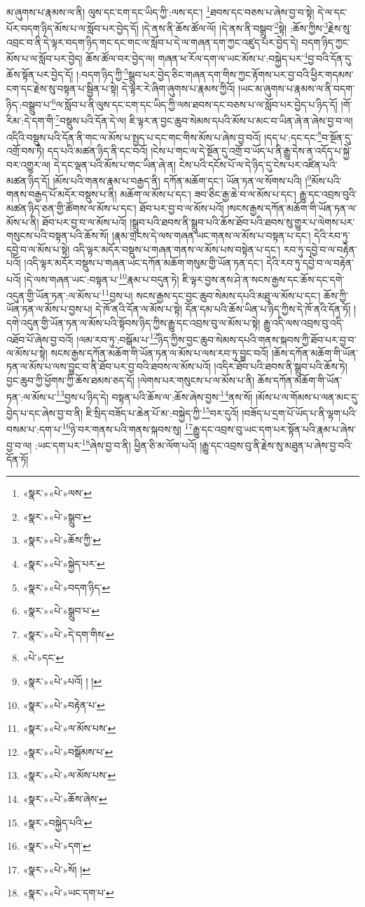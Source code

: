 མ་ཞུགས་པ་རྣམས་ལ་ནི། ལུས་དང་ངག་དང་ཡིད་ཀྱི་:ལས་དང་། \footnote{«སྣར་»«པེ་»ལས་}ཐབས་དང་བཅས་པ་ཞེས་བྱ་བ་སྟེ། དེ་ལ་དང་པོར་བདག་ཉིད་མོས་པ་ལ་སློབ་པར་བྱེད་དོ། །དེ་ནས་ནི་ཆོས་ཚོལ་ལོ། །དེ་ནས་ནི་བསྒྲུབ་\footnote{«སྣར་»«པེ་»སྒྲུབ་}སྟེ། :ཆོས་ཀྱིས་\footnote{«སྣར་»«པེ་»ཆོས་ཀྱི་}རྗེས་སུ་འབྲང་བ་ནི་དེ་ལྟར་བདག་ཉིད་གང་དང་གང་ལ་སློབ་པ་དེ་ལ་གཞན་དག་ཀྱང་འཛུད་པར་བྱེད་དེ། བདག་ཉིད་ཀྱང་མོས་པ་ལ་སློབ་པར་བྱེད། ཆོས་ཚོལ་བར་བྱེད་ལ། གཞན་ཕ་རོལ་དག་ལ་ཡང་མོས་པ་:བསྐྱེད་པར་\footnote{«སྣར་»«པེ་»སྐྱེད་པར་}བྱ་བའི་དོན་དུ་ཆོས་སྟོན་པར་བྱེད་དོ། །:བདག་ཉིད་ཀྱི་\footnote{«སྣར་»«པེ་»བདག་ཉིད་}སྒྲུབ་པར་བྱེད་ཅིང་གཞན་དག་གིས་ཀྱང་རྟོགས་པར་བྱ་བའི་ཕྱིར་གདམས་ངག་དང་རྗེས་སུ་བསྟན་པ་སྦྱིན་པ་སྟེ། དེ་ལྟར་རེ་ཞིག་ཞུགས་པ་རྣམས་ཀྱིའོ། །ཡང་མ་ཞུགས་པ་རྣམས་ལ་ནི་བདག་ཉིད་:བསྒྲུབ་པ་\footnote{«སྣར་»«པེ་»སྒྲུབ་པ་}ལ་སློབ་པ་ནི་ལུས་དང་ངག་དང་ཡིད་ཀྱི་ལས་ཐབས་དང་བཅས་པ་ལ་སློབ་པར་བྱེད་པ་ཉིད་དོ། །གོ་རིམ་:དེ་དག་གི་\footnote{«སྣར་»«པེ་»དེ་དག་གིས་}བསྡུས་པའི་དོན་དེ་ལ། ཇི་ལྟར་ན་བྱང་ཆུབ་སེམས་དཔའི་མོས་པ་མང་བ་ཡིན་ཞེ་ན་ཞེས་བྱ་བ་ལ། འདིའི་བསྡུས་པའི་དོན་ནི་གང་ལ་མོས་པ་སྤྱད་པ་དང་གང་གིས་མོས་པ་ཞེས་བྱ་བའོ། །དད་པ་:དང་དང་\footnote{«པེ་»དང་}བ་སྔོན་དུ་འགྲོ་བས་ཏེ། དད་པའི་མཚན་ཉིད་ནི་དང་བའོ། །ངེས་པ་གང་ལ་དེ་སྔོན་དུ་འགྲོ་བ་ཡོད་པ་ནི་རྒྱུ་དེས་ན་འདོད་པ་སྐྱེ་བར་འགྱུར་ལ། དེ་དང་ལྡན་པའི་མོས་པ་གང་ཡིན་ཞེ་ན། ངེས་པའི་དངོས་པོ་ལ་དེ་ཉིད་དུ་ངེས་པར་འཛིན་པའི་མཚན་ཉིད་དོ། །མོས་པའི་གནས་རྣམ་པ་བརྒྱད་ནི། དཀོན་མཆོག་དང་། ཡོན་ཏན་ལ་སོགས་པའི། །\footnote{«སྣར་»«པེ་»པའོ། ། །}མོས་པའི་གནས་བརྒྱད་པོ་མདོར་བསྡུས་པ་ནི། མཆོག་ལ་མོས་པ་དང་། ཟབ་ཅིང་རྒྱ་ཆེ་བ་ལ་མོས་པ་དང་། རྒྱུ་དང་འབྲས་བུའི་མཚན་ཉིད་ཅན་གྱི་ཚོགས་ལ་མོས་པ་དང་། ཐོབ་པར་བྱ་བ་ལ་མོས་པའོ། །སངས་རྒྱས་དཀོན་མཆོག་གི་ཡོན་ཏན་ལ་མོས་པ་ནི། ཐོབ་པར་བྱ་བ་ལ་མོས་པའོ། །སྒྲུབ་པའི་ཐབས་ནི་སྒྲུབ་པའི་ཆོས་ཐོབ་པའི་ཐབས་སུ་གྱུར་པ་ལེགས་པར་གསུངས་པའི་བསྟན་པའི་ཆོས་སོ། །རྣམ་གྲངས་དེ་ལས་གཞན་ཡང་གནས་ལ་མོས་པ་བསྟན་པ་དང་། དེའི་རབ་ཏུ་དབྱེ་བ་ལ་མོས་པ་སྟེ། འདི་ལྟར་མདོར་བསྡུས་པ་གཞན་གནས་ལ་མོས་པས་བསྟེན་པ་དང་། རབ་ཏུ་དབྱེ་བ་ལ་བརྟེན་པའོ། །འདི་ལྟར་མདོར་བསྡུས་པ་གཞན་ཡང་དཀོན་མཆོག་གསུམ་གྱི་ཡོན་ཏན་དང་། དེའི་རབ་ཏུ་དབྱེ་བ་ལ་བརྟེན་པའོ། །དེ་ལས་གཞན་ཡང་:བསྟན་པ་\footnote{«སྣར་»«པེ་»བརྟེན་པ་}རྣམ་པ་བདུན་ཏེ། ཇི་ལྟར་བྱས་ནས་ཤེ་ན་སངས་རྒྱས་དང་ཆོས་དང་དགེ་འདུན་གྱི་ཡོན་ཏན་:ལ་མོས་པ་\footnote{«སྣར་»«པེ་»ལ་མོས་པས་}བྱས་པ། སངས་རྒྱས་དང་བྱང་ཆུབ་སེམས་དཔའི་མཐུ་ལ་མོས་པ་དང་། ཆོས་ཀྱི་ཡོན་ཏན་ལ་མོས་པ་བྱས་པ། དེ་ཁོ་ནའི་དོན་ལ་མོས་པ་སྟེ། དོན་དམ་པའི་ཆོས་ཡིན་པ་ཉིད་ཀྱིས་དེ་ཁོ་ནའི་དོན་ཏོ། །དགེ་འདུན་གྱི་ཡོན་ཏན་ལ་མོས་པའི་སྟོབས་ཉིད་ཀྱིས་རྒྱུ་དང་འབྲས་བུ་ལ་མོས་པ་སྟེ། རྒྱུ་འདི་ལས་འབྲས་བུ་འདི་འཐོབ་པོ་ཞེས་བྱ་བའོ། །ལམ་རབ་ཏུ་:བསྒོམ་པ་\footnote{«སྣར་»«པེ་»བསྒོམས་པ་}ཉིད་ཀྱིས་བྱང་ཆུབ་སེམས་དཔའི་གནས་སྐབས་ཀྱི་ཐོབ་པར་བྱ་བ་ལ་མོས་པ་སྟེ། སངས་རྒྱས་དཀོན་མཆོག་གི་ཡོན་ཏན་ལ་མོས་པ་ལས་རབ་ཏུ་བྱུང་བའོ། །ཆོས་དཀོན་མཆོག་གི་ཡོན་ཏན་ལ་མོས་པ་ལས་བྱུང་བ་ནི་ཐོབ་པར་བྱ་བའི་ཐབས་ལ་མོས་པའོ། །འདིར་ཐོབ་པའི་ཐབས་ནི་སྒྲུབ་པའི་ཆོས་ཏེ། བྱང་ཆུབ་ཀྱི་ཕྱོགས་ཀྱི་ཆོས་ཐམས་ཅད་དོ། །ལེགས་པར་གསུངས་པ་ལ་མོས་པ་ནི། ཆོས་དཀོན་མཆོག་གི་ཡོན་ཏན་:ལ་མོས་པ་\footnote{«སྣར་»«པེ་»ལ་མོས་པས་}བྱས་པ་ཉིད་དེ། བསྟན་པའི་ཆོས་ལ་:ཆོས་ཞེས་བྱས་\footnote{«སྣར་»«པེ་»ཆོས་ཞེས་}ནས་སོ། །མོས་པ་ལ་གོམས་པ་ལན་མང་དུ་བྱེད་པ་དང་ཞེས་བྱ་བ་ནི། ཇི་སྲིད་བཟོད་པ་ཆེན་པོ་མ་:བསྐྱེད་ཀྱི་\footnote{«སྣར་»བསྐྱེད་པའི་}བར་དུའོ། །བཟོད་པ་དྲག་པོ་ཡོད་པ་ནི་ལྷག་པའི་བསམ་པ་:དག་པ་\footnote{«སྣར་»«པེ་»དག་}ཉེ་བར་གནས་པའི་གནས་སྐབས་སུ། \footnote{«སྣར་»«པེ་»སོ། ། }རྒྱུ་དང་འབྲས་བུ་ཡང་དག་པར་སྟོན་པའི་རྣམ་པ་ཞེས་བྱ་བ་ལ། :ཡང་དག་པར་\footnote{«སྣར་»«པེ་»ཡང་དག་པ་}ཞེས་བྱ་བ་ནི། ཕྱིན་ཅི་མ་ལོག་པའོ། །རྒྱུ་དང་འབྲས་བུ་ནི་རྗེས་སུ་མཐུན་པ་ཞེས་བྱ་བའི་དོན་ཏོ། 
